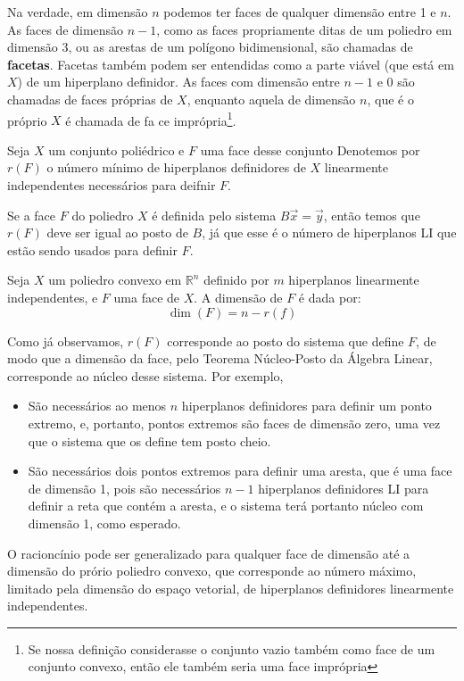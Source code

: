 Na verdade, em dimensão $n$ podemos ter faces de qualquer dimensão entre 1 e $n$.
As faces de dimensão $n - 1$, como as faces propriamente ditas de um poliedro em
dimensão 3, ou as arestas de um polígono bidimensional, são chamadas
de \textbf{facetas}. Facetas também podem ser entendidas como a parte viável
(que está em $X$) de um hiperplano definidor.  As faces com dimensão entre
$n - 1$ e $0$ são chamadas de faces próprias de $X$, enquanto aquela de dimensão
$n$, que é o próprio $X$ é chamada de fa
ce imprópria\footnote{Se nossa definição considerasse o conjunto vazio também como
face de um conjunto convexo, então ele também seria uma face imprópria}.

\begin{def:r face}
  Seja $X$ um conjunto poliédrico e $F$ uma face desse conjunto
  Denotemos por $r(F)$ o número
  mínimo de hiperplanos definidores de $X$ linearmente
  independentes necessários para deifnir $F$.
\end{def:r face}

Se a face $F$ do poliedro $X$ é definida pelo sistema $B \vec x = \vec y$,
então temos que $r(F)$ deve ser igual ao posto de $B$, já que esse é
o número de hiperplanos LI que estão sendo usados para definir $F$.

\begin{def:dimensao face}
  Seja $X$ um poliedro convexo em $\mathbb{R}^n$ definido por
  $m$ hiperplanos linearmente independentes, e $F$ uma face
  de $X$. A dimensão de $F$ é dada por:
  \begin{equation*}
  	\dim(F) = n - r(f)
  \end{equation*}
\end{def:dimensao face}

Como já observamos, $r(F)$ corresponde ao posto do sistema
que define $F$, de modo que a dimensão da face, pelo Teorema Núcleo-Posto
da Álgebra Linear, corresponde ao núcleo desse sistema. Por exemplo,

\begin{itemize}
	\item São necessários ao menos $n$ hiperplanos definidores para
	  definir um ponto extremo, e, portanto, pontos extremos são
	  faces de dimensão zero, uma vez que o sistema que os define
	  tem posto cheio.

	\item São necessários dois pontos extremos para definir uma aresta,
	  que é uma face de dimensão 1, pois são necessários $n-1$ hiperplanos
	  definidores LI para definir a reta que contém a aresta, e o sistema
	  terá portanto núcleo com dimensão 1, como esperado.
\end{itemize}

O racioncínio pode ser generalizado para qualquer face de dimensão até a
dimensão do prório poliedro convexo, que corresponde ao número máximo,
limitado pela dimensão do espaço vetorial, de hiperplanos definidores
linearmente independentes.

